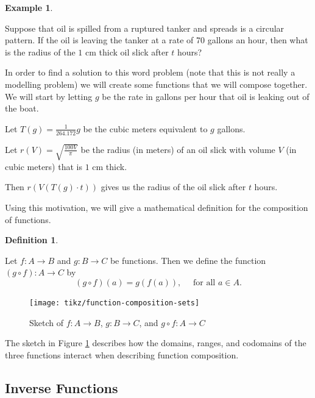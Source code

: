 \documentclass[
]{book}
\theoremstyle{definition}
\newtheorem{definition}{Definition}[chapter]
\theoremstyle{definition}
\newtheorem{example}{Example}[chapter]
\theoremstyle{definition}
\theoremstyle{definition}
\theoremstyle{remark}
\begin{document}
\begin{example}
\protect\hypertarget{exm:unlabeled-div-65}{}\label{exm:unlabeled-div-65}

Suppose that oil is spilled from a ruptured tanker and spreads is a circular pattern. If the oil is leaving the tanker at a rate of 70 gallons an hour, then what is the radius of the \(1\) cm thick oil slick after \(t\) hours?

In order to find a solution to this word problem (note that this is not really a modelling problem) we will create some functions that we will compose together. We will start by letting \(g\) be the rate in gallons per hour that oil is leaking out of the boat.

Let \(T(g)=\frac{1}{264.172} g\) be the cubic meters equivalent to \(g\) gallons.

Let \(r(V)= \sqrt{\frac{100V}{\pi}}\) be the radius (in meters) of an oil slick with volume \(V\) (in cubic meters) that is \(1\) cm thick.

Then \(r(V(T(g)\cdot t))\) gives us the radius of the oil slick after \(t\) hours.

\end{example}

Using this motivation, we will give a mathematical definition for the composition of functions.

\begin{definition}
\protect\hypertarget{def:unlabeled-div-66}{}\label{def:unlabeled-div-66}

Let \(f:A\rightarrow B\) and \(g: B \rightarrow C\) be functions. Then we define the function \((g\circ f):A\rightarrow C\) by \[(g\circ f) (a)= g(f(a)), \quad \mbox{ for all } a \in A.\]

\end{definition}

\begin{figure}

{\centering \texttt{[image: tikz/function-composition-sets]} 

}

\caption{Sketch of $f:A \rightarrow B$, $g:B \rightarrow C$, and $g \circ f: A \rightarrow C$}\label{fig:function-composition}
\end{figure}

The sketch in Figure \ref{fig:function-composition} describes how the domains, ranges, and codomains of the three functions interact when describing function composition.

\hypertarget{inverse-functions}{%
\subsection{Inverse Functions}\label{inverse-functions}}
\end{document}
